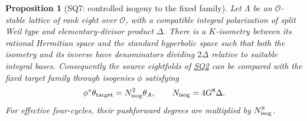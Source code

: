 \documentclass[11pt,a4paper]{article}
\newtheorem{proposition}[theorem]{Proposition}
\theoremstyle{definition}\newtheorem{definition}[theorem]{Definition}
\theoremstyle{remark}\newtheorem{remark}[theorem]{Remark}
\newcommand{\cO}{\mathcal O}\newcommand{\CH}{\operatorname{CH}}\newcommand{\cl}{\operatorname{cl}}
\newcommand{\findingref}[1]{\hyperref[#1]{\textsf{#1}}}
\begin{document}
\begin{proposition}[SQ7: controlled isogeny to the fixed family]\label{SQ7}
Let $\Lambda$ be an $\cO$-stable lattice of rank eight over $\cO$, with a compatible integral polarization of split Weil type and elementary-divisor product $\Delta$. There is a $K$-isometry between its rational Hermitian space and the standard hyperbolic space such that both the isometry and its inverse have denominators dividing $2\Delta$ relative to suitable integral bases. Consequently the source eightfolds of \findingref{SQ2} can be compared with the fixed target family through isogenies $\phi$ satisfying
\[
 \phi^*\theta_{\rm target}=N_{\rm isog}^{2}\theta_A,
 \qquad N_{\rm isog}=4G^8\Delta.
\]
For effective four-cycles, their pushforward degrees are multiplied by $N_{\rm isog}^{8}$.
\end{proposition}
\end{document}
